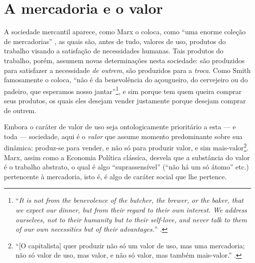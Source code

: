 \documentclass[12pt]{article}
\begin{document}
\section{A mercadoria e o valor}
A sociedade mercantil aparece, como Marx o coloca, como ``uma enorme coleção de mercadorias'' \parencite[p. 113]{Marx2017}, as quais são, antes de tudo, valores de uso, produtos do trabalho visando a satisfação de necessidades humanas. Tais produtos do trabalho, porém, assumem novas determinações nesta sociedade: são produzidos para satisfazer a necessidade \textit{de outrem}, são produzidos para a \textit{troca}. Como Smith famosamente o coloca, ``não é da benevolência do açougueiro, do cervejeiro ou do padeiro, que esperamos nosso jantar''\footnote{``\textit{It is not from the benevolence of the butcher, the brewer, or the baker, that we expect our dinner, but from their regard to their own interest. We address ourselves, not to their humanity but to their self-love, and never talk to them of our own necessities but of their advantages.}'' \parencite[p. 43]{Smith1904}.}, e sim porque tem quem queira comprar seus produtos, os quais eles desejam vender justamente porque desejam comprar de outrem. 

Embora o caráter de valor de uso seja ontologicamente prioritário a esta — e toda — sociedade, aqui é o \textit{valor} que assume momento predominante sobre sua dinâmica: produz-se para vender, e não só para produzir valor, e sim mais-valor\footnote{``[O capitalista] quer produzir não só um valor de uso, mas uma mercadoria; não só valor de uso, mas valor, e não só valor, mas também mais-valor.'' \parencite[p. 263]{Marx2017}.}. Marx, assim como a Economia Política clássica, desvela que a substância do valor é o trabalho abstrato, o qual é algo ``suprassensível'' (``não há um só átomo'' etc.) pertencente à mercadoria, isto é, é algo de caráter social que lhe pertence.
\end{document}
